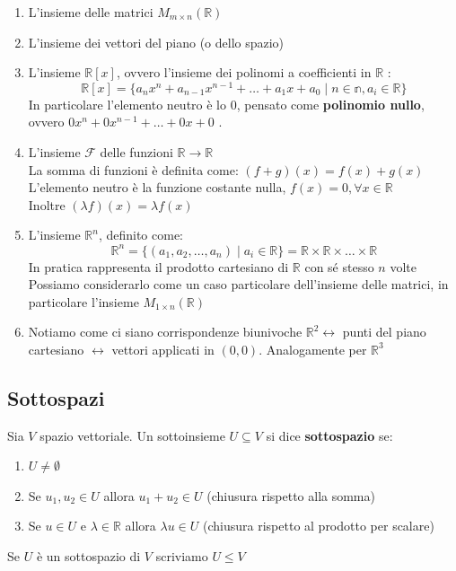 \documentclass[
  a4paper,
]{article}
\begin{document}
\begin{enumerate}
\def\labelenumi{\arabic{enumi}.}
\item
  L'insieme delle matrici \(M_{m \times n}(\mathbb{R})\)
\item
  L'insieme dei vettori del piano (o dello spazio)
\item
  L'insieme \(\mathbb{R}[x]\), ovvero l'insieme dei polinomi a
  coefficienti in \(\mathbb{R}\) : \[
  \mathbb{R}[x] = \{a_n x^n + a_{n-1} x^{n-1} + \dots + a_1 x + a_0 \mid n \in \mathbb{n}, a_i \in \mathbb{R}\}
  \] In particolare l'elemento neutro è lo \(0\), pensato come
  \textbf{polinomio nullo}, ovvero \(0x^n + 0x^{n-1} + \dots + 0x + 0\)
  .
\item
  L'insieme \(\mathcal{F}\) delle funzioni
  \(\mathbb{R} \to \mathbb{R}\)\\
  La somma di funzioni è definita come: \((f + g)(x) = f(x) + g(x)\)\\
  L'elemento neutro è la funzione costante nulla,
  \(f(x) = 0, \forall x \in \mathbb{R}\)\\
  Inoltre \((\lambda f)(x) = \lambda f(x)\)
\item
  L'insieme \(\mathbb{R}^n\), definito come: \[
  \mathbb{R}^n = \{(a_1, a_2, \dots, a_n) \mid a_i \in \mathbb{R}\} = \mathbb{R} \times \mathbb{R} \times \dots \times \mathbb{R}
  \] In pratica rappresenta il prodotto cartesiano di \(\mathbb{R}\) con
  sé stesso \(n\) volte Possiamo considerarlo come un caso particolare
  dell'insieme delle matrici, in particolare l'insieme
  \(M_{1 \times n}(\mathbb{R})\)
\item
  Notiamo come ci siano corrispondenze biunivoche
  \(\mathbb{R}^2 \leftrightarrow\) punti del piano cartesiano
  \(\leftrightarrow\) vettori applicati in \((0, 0)\). Analogamente per
  \(\mathbb{R}^3\)
\end{enumerate}

\hypertarget{sottospazi}{%
\subsection{Sottospazi}\label{sottospazi}}

\begin{definitionbox}
Sia \(V\) spazio vettoriale. Un sottoinsieme \(U \subseteq V\) si dice
\textbf{sottospazio} se:

\begin{enumerate}
\def\labelenumi{\arabic{enumi}.}
\item
  \(U \not = \emptyset\)
\item
  Se \(u_1, u_2 \in U\) allora \(u_1 + u_2 \in U\) (chiusura rispetto
  alla somma)
\item
  Se \(u \in U\) e \(\lambda \in \mathbb{R}\) allora \(\lambda u \in U\)
  (chiusura rispetto al prodotto per scalare)
\end{enumerate}

Se \(U\) è un sottospazio di \(V\) scriviamo \(U \leq V\)
\end{definitionbox}
\end{document}
